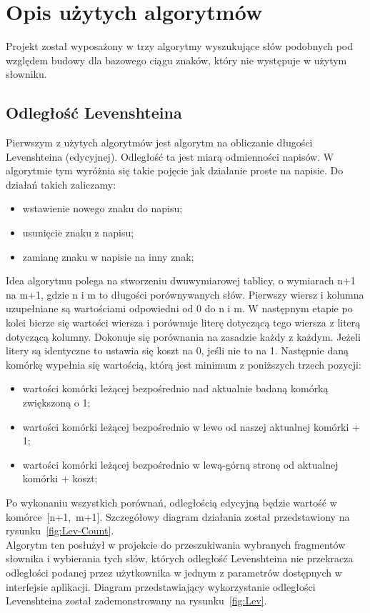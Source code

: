 \chapter{Opis użytych algorytmów}
Projekt został wyposażony w trzy algorytmy wyszukujące słów podobnych pod względem budowy dla bazowego ciągu znaków, który nie występuje w użytym słowniku. 

\section{Odległość Levenshteina} \label{chap:Lev}
Pierwszym z użytych algorytmów jest algorytm na obliczanie długości Levenshteina (edycyjnej). Odległość ta jest miarą odmienności napisów. W algorytmie tym wyróżnia się takie pojęcie jak działanie proste na napisie. Do działań takich zaliczamy:
\begin{itemize}
	\item wstawienie nowego znaku do napisu;
	\item usunięcie znaku z napisu;
	\item zamianę znaku w napisie na inny znak;
\end{itemize}

Idea algorytmu polega na stworzeniu dwuwymiarowej tablicy, o wymiarach n+1 na m+1, gdzie n i m to długości porównywanych słów. Pierwszy wiersz i kolumna uzupełniane są wartościami odpowiedni od 0 do n i m. W następnym etapie po kolei bierze się wartości wiersza i porównuje literę dotyczącą tego wiersza z literą dotyczącą kolumny. Dokonuje się porównania na zasadzie każdy z każdym. Jeżeli litery są identyczne to ustawia się koszt na 0, jeśli nie to na 1. Następnie daną komórkę wypełnia się wartością, którą jest minimum z poniższych trzech pozycji:
\begin{itemize}
	\item wartości komórki leżącej bezpośrednio nad aktualnie badaną komórką zwiększoną o 1;
	\item wartości komórki leżącej bezpośrednio w lewo od naszej aktualnej komórki + 1;
	\item wartości komórki leżącej bezpośrednio w lewą-górną stronę od aktualnej komórki + koszt;
\end{itemize}
Po wykonaniu wszystkich porównań, odległością edycyjną będzie wartość w komórce~[n+1,~m+1]. Szczegółowy diagram działania został przedstawiony na rysunku~\ref{fig:Lev-Count}. \\

Algorytm ten posłużył w projekcie do przeszukiwania wybranych fragmentów słownika i wybierania tych słów, których odległość Levenshteina nie przekracza odległości podanej przez użytkownika w jednym z parametrów dostępnych w interfejsie aplikacji. Diagram przedstawiający wykorzystanie odległości Levenshteina został zademonstrowany na rysunku~\ref{fig:Lev}.

